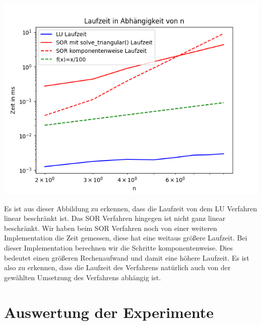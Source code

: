 \documentclass[smallheadings]{scrartcl}
\theoremstyle{definition}
\begin{document}
\begin{minipage}{\textwidth}

 \centering
 \includegraphics[scale = 0.9]{time1}
 	\label{time}

 \end{minipage}

Es ist aus dieser Abbildung zu erkennen, dass die Laufzeit von dem LU Verfahren linear beschränkt ist.  Das SOR Verfahren hingegen ist nicht ganz linear beschränkt.  Wir haben beim SOR Verfahren noch von einer weiteren Implementation die Zeit gemessen, diese hat eine weitaus größere Laufzeit. Bei dieser Implementation berechnen wir die Schritte komponentenweise. Dies bedeutet einen größeren Rechenaufwand und damit eine höhere Laufzeit. Es ist also zu erkennen, dass die Laufzeit des Verfahrens natürlich auch 
von der gewählten Umsetzung des Verfahrens abhängig ist. 


\section{Auswertung der Experimente}
\end{document}
